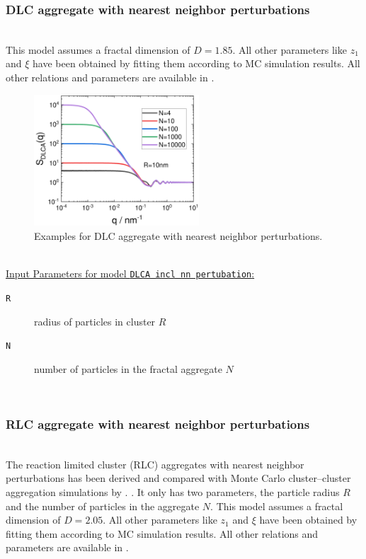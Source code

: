 \subsubsection{DLC aggregate with nearest neighbor perturbations}~\\
\label{sec:SQ_DLCA_incl_NN}
This model assumes a fractal dimension of $D=1.85$. All other parameters like $z_1$ and $\xi$ have been obtained by fitting them according to MC simulation results. All other relations and parameters are available in \cite{Lattuada2003}.
\begin{figure}[htb]
\begin{center}
\includegraphics[width=0.55\textwidth]{../images/structure_factor/MassFractals/DLCAinclNN.pdf}
\end{center}
\caption{Examples for DLC aggregate with nearest neighbor perturbations.}
\label{fig:SQ_DLCA_NN}
\end{figure}

~\\
\noindent \uline{Input Parameters for model \texttt{DLCA incl nn pertubation}:}
\begin{description}
\item[\texttt{R}] radius of particles in cluster $R$
\item[\texttt{N}] number of particles in the fractal aggregate $N$
\end{description}

~\\
\subsubsection{RLC aggregate with nearest neighbor perturbations}~\\
\label{sec:SQ_RLCA_incl_NN}
The reaction limited cluster (RLC) aggregates with nearest neighbor perturbations has been derived  and compared with Monte Carlo cluster–cluster aggregation simulations by \cite{Lattuada2003}. . It only has two parameters, the particle radius $R$ and the number of particles in the aggregate $N$. This model assumes a fractal dimension of $D=2.05$. All other parameters like $z_1$ and $\xi$ have been obtained by fitting them according to MC simulation results. All other relations and parameters are available in \cite{Lattuada2003}.


